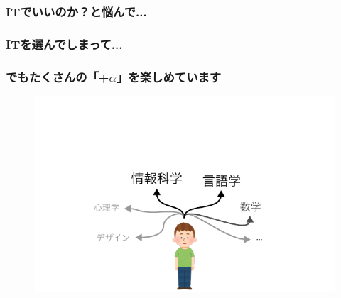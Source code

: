 \documentclass[lualatex,aspectratio=169]{beamer}
\begin{document}
\begin{frame}[t]
    \frametitle<1>{ITでいいのか？と悩んで...}
    \frametitle<2-6>{ITを選んでしまって...}
    \frametitle<7>{でもたくさんの「+$\alpha$」を楽しめています}
    \begin{figure}
        \begin{overprint}
            \begin{center}\includegraphics[width=0.8\linewidth]{./img/intro_4.pdf}\end{center}


\end{overprint}
\end{figure}
\end{frame}
\end{document}
